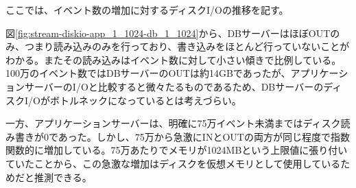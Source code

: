 \documentclass[../../../../../main]{subfiles}
\begin{document}
    \label{subsubsec:result-chunk-only-limit-diskio}

    ここでは、イベント数の増加に対するディスクI/Oの推移を記す。

    

    図\ref{fig:stream-diskio-app_1_1024-db_1_1024}から、DBサーバーはほぼOUTのみ、つまり読み込みのみを行っており、書き込みをほとんど行っていないことがわかる。またその読み込みはイベント数に対して小さい傾きで比例している。100万のイベント数ではDBサーバーのOUTは約14GBであったが、アプリケーションサーバーのI/Oと比較すると微々たるものであるため、DBサーバーのディスクI/Oがボトルネックになっているとは考えづらい。

    一方、アプリケーションサーバーは、明確に75万イベント未満まではディスク読み書きが0であった。しかし、75万から急激にINとOUTの両方が同じ程度で指数関数的に増加している。75万あたりでメモリが1024MBという上限値に張り付いていたことから、この急激な増加はディスクを仮想メモリとして使用しているためだと推測できる。
\end{document}
